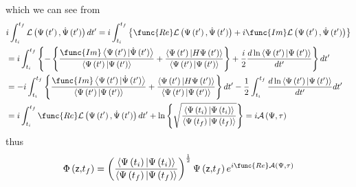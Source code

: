 \documentclass[aps,preprint]{revtex4}
\begin{document}
which we can see from 
\begin{align}
& i\int_{t_{i}}^{t_{f}}\mathcal{L}\left( \Psi\left( t^{\prime}\right) ,\dot{%
\Psi}\left( t^{\prime}\right) \right)
dt^{\prime}=i\int_{t_{i}}^{t_{f}}\left\{ \func{Re}\mathcal{L}\left(
\Psi\left( t^{\prime }\right) ,\dot{\Psi}\left( t^{\prime}\right) \right) +i%
\func{Im}\mathcal{L}\left( \Psi\left( t^{\prime}\right) ,\dot{\Psi}\left(
t^{\prime}\right) \right) \right\}  \notag \\
& =i\int_{t_{i}}^{t_{f}}\left\{ -\left\{ \frac{\func{Im}\left\langle
\Psi\left( t^{\prime}\right) |\dot{\Psi}\left( t^{\prime}\right)
\right\rangle }{\left\langle \Psi\left( t^{\prime}\right) |\Psi\left(
t^{\prime}\right) \right\rangle }+\frac{\left\langle \Psi\left( t^{\prime
}\right) |H\Psi\left( t^{\prime}\right) \right\rangle }{\left\langle
\Psi\left( t^{\prime}\right) |\Psi\left( t^{\prime}\right) \right\rangle }%
\right\} +\frac{i}{2}\frac{d\ln\left\langle \Psi\left( t^{\prime}\right)
|\Psi\left( t^{\prime}\right) \right\rangle }{dt^{\prime}}\right\}
dt^{\prime}  \notag \\
& =-i\int_{t_{i}}^{t_{f}}\left\{ \frac{\func{Im}\left\langle \Psi\left(
t^{\prime}\right) |\dot{\Psi}\left( t^{\prime}\right) \right\rangle }{%
\left\langle \Psi\left( t^{\prime}\right) |\Psi\left( t^{\prime}\right)
\right\rangle }+\frac{\left\langle \Psi\left( t^{\prime }\right)
|H\Psi\left( t^{\prime}\right) \right\rangle }{\left\langle \Psi\left(
t^{\prime}\right) |\Psi\left( t^{\prime}\right) \right\rangle }\right\}
dt^{\prime}-\frac{1}{2}\int_{t_{i}}^{t_{f}}\frac{d\ln\left\langle \Psi\left(
t^{\prime}\right) |\Psi\left( t^{\prime}\right) \right\rangle }{dt^{\prime}}%
dt^{\prime}  \notag \\
& =i\int_{t_{i}}^{t_{f}}\func{Re}\mathcal{L}\left( \Psi\left(
t^{\prime}\right) ,\dot{\Psi}\left( t^{\prime}\right) \right) dt^{\prime
}+\ln\left\{ \sqrt{\frac{\left\langle \Psi\left( t_{i}\right) |\Psi\left(
t_{i}\right) \right\rangle }{\left\langle \Psi\left( t_{f}\right)
|\Psi\left( t_{f}\right) \right\rangle }}\right\} =i\mathcal{A}\left(
\Psi,\tau\right)
\end{align}
thus 
\begin{equation}
\Phi\left( \mathsf{z,}t_{f}\right) =\left( \frac{\left\langle \Psi\left(
t_{i}\right) |\Psi\left( t_{i}\right) \right\rangle }{\left\langle
\Psi\left( t_{f}\right) |\Psi\left( t_{f}\right) \right\rangle }\right) ^{%
\frac{1}{2}}\Psi\left( \mathsf{z,}t_{f}\right) e^{i\func{Re}\mathcal{A}%
\left( \Psi,\tau\right) }  \label{phi}
\end{equation}
\end{document}

